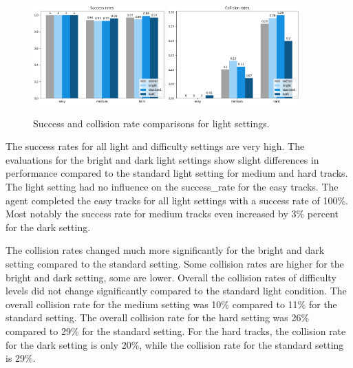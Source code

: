 \begin{figure}
    \centering
    \includegraphics[width=0.45\textwidth]{Bilder/notebook_images/success_trainedHardStandardDistanceRewardEval_all_success_rates_barplot.png}
    \includegraphics[width=0.45\textwidth]{Bilder/notebook_images/success_trainedHardStandardDistanceRewardEval_all_collision_rates_barplot.png}
    \caption{Success and collision rate comparisons for light settings.}
    \label{fig:result_success_rates_lightSettings}
\end{figure}

The success rates for all light and difficulty settings are very high. The evaluations for the bright and dark light settings show slight differences in performance compared to the standard light setting for medium and hard tracks. The light setting had no influence on the success\_rate for the easy tracks. The agent completed the easy tracks for all light settings with a success rate of 100\%.
Most notably the success rate for medium tracks even increased by 3\% percent for the dark setting. 

The collision rates changed much more significantly for the bright and dark setting compared to the standard setting. Some collision rates are higher for the bright and dark setting, some are lower. Overall the collision rates of difficulty levels did not change significantly compared to the standard light condition. The overall collision rate for the medium setting was 10\% compared to 11\% for the standard setting. The overall collision rate for the hard setting was 26\% compared to 29\% for the standard setting.
For the hard tracks, the collision rate for the dark setting is only 20\%, while the collision rate for the standard setting is 29\%. 

